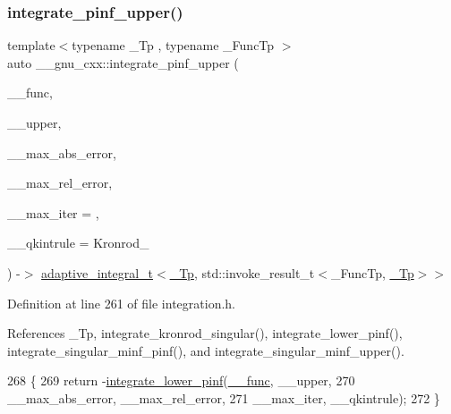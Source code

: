 \subsubsection{\texorpdfstring{integrate\+\_\+pinf\+\_\+upper()}{integrate\_pinf\_upper()}}
{\footnotesize\ttfamily template$<$typename \+\_\+\+Tp , typename \+\_\+\+Func\+Tp $>$ \\
auto \+\_\+\+\_\+gnu\+\_\+cxx\+::integrate\+\_\+pinf\+\_\+upper (\begin{DoxyParamCaption}\item[{\+\_\+\+Func\+Tp}]{\+\_\+\+\_\+func,  }\item[{\hyperlink{namespace____gnu__cxx_a3b19a9c800ca194374ef9172290f7d79}{\+\_\+\+Tp}}]{\+\_\+\+\_\+upper,  }\item[{\hyperlink{namespace____gnu__cxx_a3b19a9c800ca194374ef9172290f7d79}{\+\_\+\+Tp}}]{\+\_\+\+\_\+max\+\_\+abs\+\_\+error,  }\item[{\hyperlink{namespace____gnu__cxx_a3b19a9c800ca194374ef9172290f7d79}{\+\_\+\+Tp}}]{\+\_\+\+\_\+max\+\_\+rel\+\_\+error,  }\item[{std\+::size\+\_\+t}]{\+\_\+\+\_\+max\+\_\+iter = {},  }\item[{Kronrod\+\_\+\+Rule}]{\+\_\+\+\_\+qkintrule = {\ttfamily Kronrod\+\_} }\end{DoxyParamCaption}) -\/$>$ \hyperlink{struct____gnu__cxx_1_1adaptive__integral__t}{adaptive\+\_\+integral\+\_\+t}$<$\hyperlink{namespace____gnu__cxx_a3b19a9c800ca194374ef9172290f7d79}{\+\_\+\+Tp}, std\+::invoke\+\_\+result\+\_\+t$<$\+\_\+\+Func\+Tp, \hyperlink{namespace____gnu__cxx_a3b19a9c800ca194374ef9172290f7d79}{\+\_\+\+Tp}$>$$>$
    \hspace{0.3cm}{\ttfamily [inline]}}



Definition at line 261 of file integration.\+h.



References \+\_\+\+Tp, integrate\+\_\+kronrod\+\_\+singular(), integrate\+\_\+lower\+\_\+pinf(), integrate\+\_\+singular\+\_\+minf\+\_\+pinf(), and integrate\+\_\+singular\+\_\+minf\+\_\+upper().


\begin{DoxyCode}
268     \{
269       \textcolor{keywordflow}{return} -\hyperlink{namespace____gnu__cxx_ad1f0fd43b7a498328749e924085b4fc1}{integrate\_lower\_pinf}(\hyperlink{namespace____gnu__cxx_af2b2f0c7a2ae72b922b1afefae5a65b2}{\_\_func}, \_\_upper,
270                                    \_\_max\_abs\_error, \_\_max\_rel\_error,
271                                    \_\_max\_iter, \_\_qkintrule);
272     \}
\end{DoxyCode}
\mbox{\label{namespace____gnu__cxx_a1a1d8483b332a01301f43871dd7b3cd3}} 
